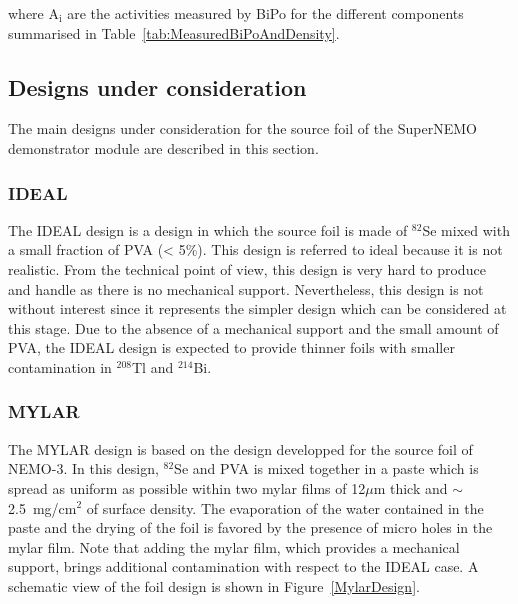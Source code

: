 \documentclass[main.tex]{subfiles}
\begin{document}
\NI where A$_\text{i}$ are the activities measured by BiPo for the different components summarised in Table~\ref{tab:MeasuredBiPoAndDensity}.


\subsection{Designs under consideration}\label{sec:designUnderConsideration}


\NI The main designs under consideration for the source foil of the SuperNEMO demonstrator module are described in this section. 


\subsubsection{IDEAL}


\NI The IDEAL design is a design in which the source foil is made of $^{\text{82}}$Se mixed with a small fraction of PVA (< 5\%). This design is referred to ideal because it is not realistic. From the technical point of view, this design is very hard to produce and handle as there is no mechanical support. Nevertheless, this design is not without interest since it represents the simpler design which can be considered at this stage. Due to the absence of a mechanical support and the small amount of PVA, the IDEAL design is expected to provide thinner foils with smaller contamination in $^{\text{208}}$Tl and $^{\text{214}}$Bi.


\subsubsection{MYLAR}


\NI The MYLAR design is based on the design developped for the source foil of NEMO-3. In this design, $^{\text{82}}$Se and PVA is mixed together in a paste which is spread as uniform as possible within two mylar films of 12$\mu$m thick and $\sim$2.5~mg/cm$^\text{2}$ of surface density. The evaporation of the water contained in the paste and the drying of the foil is favored by the presence of micro holes in the mylar film. Note that adding the mylar film, which provides a mechanical support, brings additional contamination with respect to the IDEAL case. A schematic view of the foil design is shown in Figure~\ref{MylarDesign}.
\end{document}
